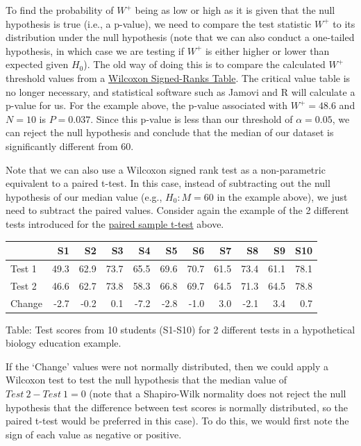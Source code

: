 \documentclass[
]{scrbook}
\begin{document}
To find the probability of \(W^{+}\) being as low or high as it is given that the null hypothesis is true (i.e., a p-value), we need to compare the test statistic \(W^{+}\) to its distribution under the null hypothesis (note that we can also conduct a one-tailed hypothesis, in which case we are testing if \(W^{+}\) is either higher or lower than expected given \(H_{0}\)).
The old way of doing this is to compare the calculated \(W^{+}\) threshold values from a \protect\hyperlink{wilcoxon-signed-rank-critical-values}{Wilcoxon Signed-Ranks Table}.
The critical value table is no longer necessary, and statistical software such as Jamovi and R will calculate a p-value for us.
For the example above, the p-value associated with \(W^{+} = 48.6\) and \(N = 10\) is \(P = 0.037\).
Since this p-value is less than our threshold of \(\alpha = 0.05\), we can reject the null hypothesis and conclude that the median of our dataset is significantly different from 60.

Note that we can also use a Wilcoxon signed rank test as a non-parametric equivalent to a paired t-test.
In this case, instead of subtracting out the null hypothesis of our median value (e.g., \(H_{0}: M = 60\) in the example above), we just need to subtract the paired values.
Consider again the example of the 2 different tests introduced for the \protect\hyperlink{paired-sample-t-test}{paired sample t-test} above.

\begin{tabular}{l|r|r|r|r|r|r|r|r|r|r}
\hline
  & S1 & S2 & S3 & S4 & S5 & S6 & S7 & S8 & S9 & S10\\
\hline
Test 1 & 49.3 & 62.9 & 73.7 & 65.5 & 69.6 & 70.7 & 61.5 & 73.4 & 61.1 & 78.1\\
\hline
Test 2 & 46.6 & 62.7 & 73.8 & 58.3 & 66.8 & 69.7 & 64.5 & 71.3 & 64.5 & 78.8\\
\hline
Change & -2.7 & -0.2 & 0.1 & -7.2 & -2.8 & -1.0 & 3.0 & -2.1 & 3.4 & 0.7\\
\hline
\end{tabular}

Table: Test scores from 10 students (S1-S10) for 2 different tests in a hypothetical biology education example.

If the `Change' values were not normally distributed, then we could apply a Wilcoxon test to test the null hypothesis that the median value of \(Test\:2 - Test\:1 = 0\) (note that a Shapiro-Wilk normality does not reject the null hypothesis that the difference between test scores is normally distributed, so the paired t-test would be preferred in this case).
To do this, we would first note the sign of each value as negative or positive.
\end{document}
